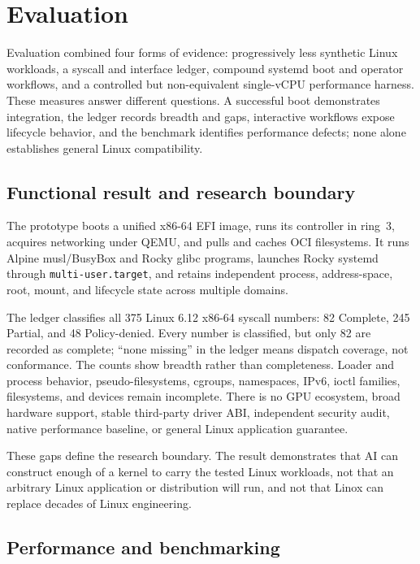 \documentclass[11pt]{article}
\begin{document}
\section{Evaluation}

Evaluation combined four forms of evidence: progressively less synthetic Linux
workloads, a syscall and interface ledger, compound systemd boot and operator
workflows, and a controlled but non-equivalent single-vCPU performance harness.
These measures answer
different questions. A successful boot demonstrates integration, the ledger
records breadth and gaps, interactive workflows expose lifecycle behavior, and
the benchmark identifies performance defects; none alone establishes general
Linux compatibility.

\subsection{Functional result and research boundary}

The prototype boots a unified x86-64 EFI image, runs its controller in ring~3,
acquires networking under QEMU, and pulls and caches OCI filesystems. It runs
Alpine musl/BusyBox and Rocky glibc programs, launches Rocky systemd through
\texttt{multi-user.target}, and retains independent process, address-space,
root, mount, and lifecycle state across multiple domains.

The ledger classifies all 375 Linux 6.12 x86-64 syscall numbers: 82 Complete,
245 Partial, and 48 Policy-denied. Every number is classified, but only 82 are
recorded as complete; ``none missing'' in the ledger means dispatch coverage,
not conformance. The counts show breadth rather than completeness. Loader and
process behavior, pseudo-filesystems, cgroups,
namespaces, IPv6, ioctl families, filesystems, and devices remain incomplete.
There is no GPU ecosystem, broad hardware support, stable third-party driver
ABI, independent security audit, native performance baseline, or general Linux
application guarantee.

These gaps define the research boundary. The result demonstrates that AI can
construct enough of a kernel to carry the tested Linux workloads, not that an
arbitrary Linux application or distribution will run, and not that Linox can
replace decades of Linux engineering.

\subsection{Performance and benchmarking}
\label{sec:performance}
\end{document}
